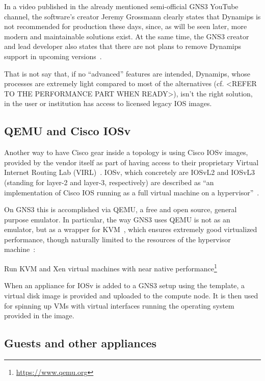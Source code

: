 In a video published in the already mentioned semi-official GNS3 YouTube channel, the software's creator Jeremy Grossmann clearly states that Dynamips is not recommended for production these days, since, as will be seen later, more modern and maintainable solutions exist. At the same time, the GNS3 creator and lead developer also states that there are not plans to remove Dynamips support in upcoming versions~\cite{ytdynamipsvpcs}.

That is not say that, if no ``advanced'' features are intended, Dynamips, whose processes are extremely light compared to most of the alternatives (cf. <REFER TO THE PERFORMANCE PART WHEN READY>), isn't the right solution, in the user or institution has access to licensed legacy IOS images. %

\subsection{QEMU and Cisco IOSv}
\label{subsec:gns3ciscoiosv}

Another way to have Cisco gear inside a topology is using Cisco IOSv images, provided by the vendor itself as part of having access to their proprietary Virtual Internet Routing Lab (VIRL)~\cite{ciscovirl}.
IOSv, which concretely are IOSvL2 and IOSvL3 (standing for layer-2 and layer-3, respectively) are described as ``an implementation of Cisco IOS running as a full virtual machine on a hypervisor''~\cite{ciscoiosvinfo}.

On GNS3 this is accomplished via QEMU, a free and open source, general purpose emulator.
In particular, the way GNS3 uses QEMU is not as an emulator, but as a wrapper for KVM~\cite{whatiskvm}, which ensures extremely good virtualized performance, though naturally limited to the resources of the hypervisor machine~:
\begin{displayquote}
Run KVM and Xen virtual machines with near native performance\footnote{\url{https://www.qemu.org}}
\end{displayquote}

When an appliance for IOSv is added to a GNS3 setup using the template, a virtual disk image is provided and uploaded to the compute node.
It is then used for spinning up VMs with virtual interfaces running the operating system provided in the image. %

\subsection{Guests and other appliances}
\label{subsec:gns3guestsappliances}

